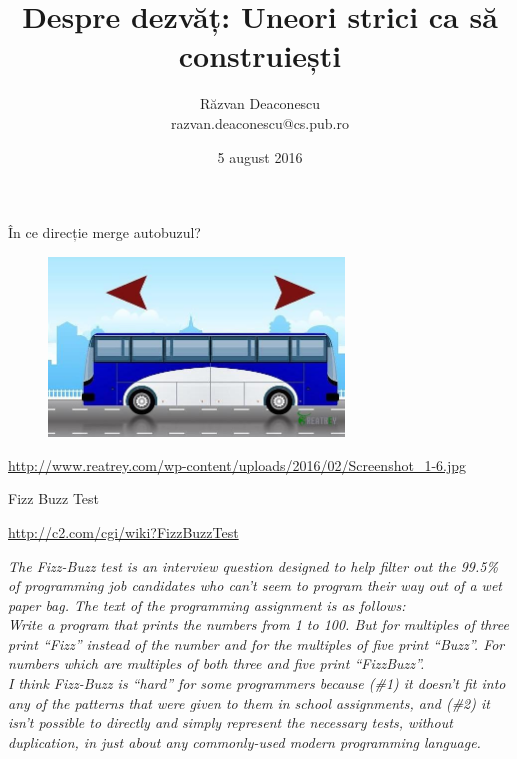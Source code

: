 \documentclass{beamer}
\title[Despre dezvăț]{Despre dezvăț: Uneori strici ca să construiești}
\institute{InfoEducație 2016 (Gălăciuc, Vrancea)}
\author[Răzvan Deaconescu]{Răzvan Deaconescu \\
razvan.deaconescu@cs.pub.ro}
\date{5 august 2016}
\begin{document}
\frame{\titlepage}

\begin{frame}{În ce direcție merge autobuzul?}
  \begin{figure}
    \centering
    \includegraphics[width=0.7\textwidth]{img/bus-direction}
  \end{figure}
  \begin{center}
    \scriptsize
    \url{http://www.reatrey.com/wp-content/uploads/2016/02/Screenshot_1-6.jpg}
  \end{center}
\end{frame}

\begin{frame}{Fizz Buzz Test}
  \begin{center}
    \small
    \url{http://c2.com/cgi/wiki?FizzBuzzTest}
  \end{center}
  \scriptsize
  \pause \textit{The Fizz-Buzz test is an interview question designed to help filter out the 99.5\% of programming job candidates who can't seem to program their way out of a wet paper bag. The text of the programming assignment is as follows:} \\
  \vspace{3mm}
  \pause \textit{Write a program that prints the numbers from 1 to 100. But for multiples of three print ``Fizz'' instead of the number and for the multiples of five print ``Buzz''. For numbers which are multiples of both three and five print ``FizzBuzz''.} \\
  \vspace{3mm}
  \pause \textit{I think Fizz-Buzz is ``hard'' for some programmers because (\#1) it doesn't fit into any of the patterns that were given to them in school assignments, and (\#2) it isn't possible to directly and simply represent the necessary tests, without duplication, in just about any commonly-used modern programming language.} \\
\end{frame}
\end{document}
